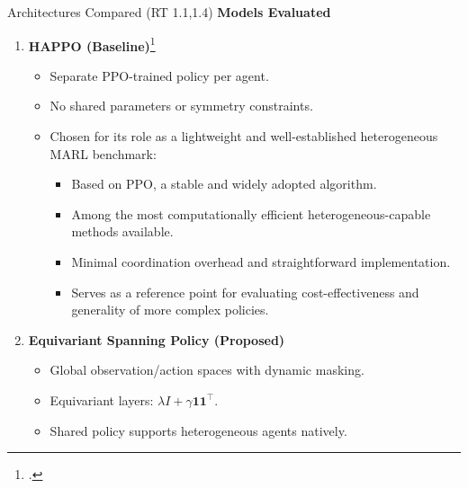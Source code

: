 \begin{frame}{Architectures Compared (RT 1.1,1.4)}
    \textbf{Models Evaluated}
    \begin{enumerate}
        \item \textbf{HAPPO (Baseline)}\footcite{zhong2024}
          \begin{itemize}
            \item Separate PPO-trained policy per agent.
            \item No shared parameters or symmetry constraints.
            \item Chosen for its role as a lightweight and well-established heterogeneous MARL benchmark:
            \begin{itemize}
                \item Based on PPO, a stable and widely adopted algorithm.
                \item Among the most computationally efficient heterogeneous-capable methods available.
                \item Minimal coordination overhead and straightforward implementation.
                \item Serves as a reference point for evaluating cost-effectiveness and generality of more complex policies.
            \end{itemize}
          \end{itemize}
        \item \textbf{Equivariant Spanning Policy (Proposed)}
          \begin{itemize}
            \item Global observation/action spaces with dynamic masking.
            \item Equivariant layers: \(\lambda I + \gamma \mathbf{11}^\top\).
            \item Shared policy supports heterogeneous agents natively.
          \end{itemize}
    \end{enumerate}
\end{frame}




